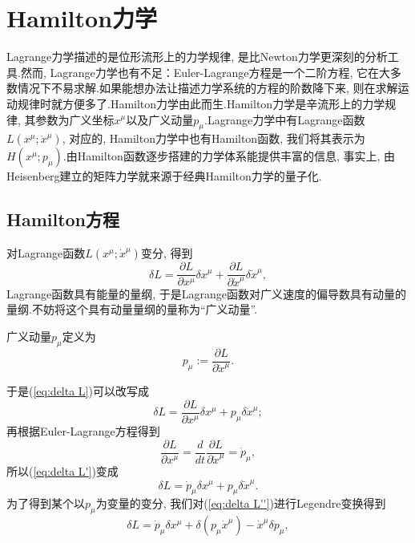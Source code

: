   \section{Hamilton力学}\label{sec:hamiltonian}
		Lagrange力学描述的是位形流形上的力学规律, 是比Newton力学更深刻的分析工具.然而, Lagrange力学也有不足：Euler-Lagrange方程是一个二阶方程, 它在大多数情况下不易求解.如果能想办法让描述力学系统的方程的阶数降下来, 则在求解运动规律时就方便多了.Hamilton力学由此而生.Hamilton力学是辛流形上的力学规律, 其参数为广义坐标$x^\mu$以及广义动量$p_\mu$.Lagrange力学中有Lagrange函数$L(x^\mu;{\dot{x}}^\mu)$, 对应的, Hamilton力学中也有Hamilton函数, 我们将其表示为$H(x^\mu;p_\mu)$.由Hamilton函数逐步搭建的力学体系能提供丰富的信息, 事实上, 由Heisenberg建立的矩阵力学就来源于经典Hamilton力学的量子化.
	\subsection{Hamilton方程}
		对Lagrange函数$L(x^\mu;{\dot{x}}^\mu)$变分, 得到
		\begin{equation}\label{eq:delta L}
		\delta L=\frac{\partial L}{\partial x^\mu}\delta x^\mu+\frac{\partial L}{\partial {\dot{x}}^\mu}\delta {\dot{x}}^\mu,
		\end{equation}
		Lagrange函数具有能量的量纲, 于是Lagrange函数对广义速度的偏导数具有动量的量纲.不妨将这个具有动量量纲的量称为“广义动量”.
		\begin{definition}
		广义动量$p_\mu$定义为
		\begin{equation}
			p_\mu:=\frac{\partial L}{\partial {\dot{x}}^\mu}.
		\end{equation}
		\end{definition}
		于是(\ref{eq:delta L})可以改写成
		\begin{equation}\label{eq:delta L'}
		\delta L=\frac{\partial L}{\partial x^\mu}\delta x^\mu+p_\mu\delta {\dot{x}}^\mu;
		\end{equation}
		再根据Euler-Lagrange方程得到
		\begin{equation*}
		\frac{\partial L}{\partial x^\mu}=\frac{d}{dt}\frac{\partial L}{\partial {\dot{x}}^\mu}={\dot{p}}_\mu,
		\end{equation*}
		所以(\ref{eq:delta L'})变成
		\begin{equation}\label{eq:delta L''}
		\delta L={\dot{p}}_\mu\delta x^\mu+p_\mu\delta {\dot{x}}^\mu.
		\end{equation}
		为了得到某个以$p_\mu$为变量的变分, 我们对(\ref{eq:delta L''})进行Legendre变换得到
		\begin{equation*}
		\delta L={\dot{p}}_\mu\delta x^\mu+\delta(p_\mu{\dot{x}}^\mu)-{\dot{x}}^\mu\delta p_\mu,
		\end{equation*}
